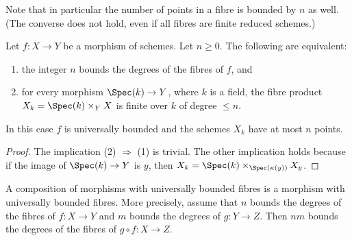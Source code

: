 \noindent
Note that in particular the number of points in a fibre is bounded by $n$
as well. (The converse does not hold, even if all fibres are finite reduced
schemes.)

\begin{lemma}
\label{lemma-characterize-universally-bounded}
Let $f : X \to Y$ be a morphism of schemes. Let $n \geq 0$.
The following are equivalent:
\begin{enumerate}
\item the integer $n$ bounds the degrees of the fibres of $f$, and
\item for every morphism $\Spec(k) \to Y$, where $k$ is a field,
the fibre product $X_k = \Spec(k) \times_Y X$ is finite over $k$
of degree $\leq n$.
\end{enumerate}
In this case $f$ is universally bounded and the schemes $X_k$ have at most
$n$ points.
\end{lemma}

\begin{proof}
The implication (2) $\Rightarrow$ (1) is trivial. The other implication
holds because if the image of $\Spec(k) \to Y$ is $y$, then
$X_k = \Spec(k) \times_{\Spec(\kappa(y))} X_y$.
\end{proof}

\begin{lemma}
\label{lemma-composition-universally-bounded}
A composition of morphisms with universally bounded fibres
is a morphism with universally bounded fibres. More precisely,
assume that $n$ bounds the degrees of the fibres of $f : X \to Y$ and
$m$ bounds the degrees of $g : Y \to Z$.
Then $nm$ bounds the degrees of the fibres of $g \circ f : X \to Z$.
\end{lemma}

